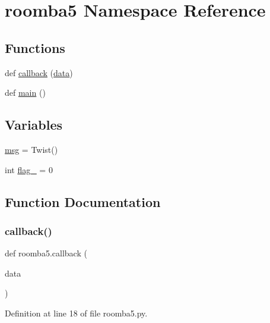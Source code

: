 \hypertarget{namespaceroomba5}{}\section{roomba5 Namespace Reference}
\label{namespaceroomba5}
\subsection*{Functions}
\begin{DoxyCompactItemize}
\item 
def \mbox{\hyperlink{namespaceroomba5_ad07c1fa90ebc06ca037e82ceeb96c024}{callback}} (\mbox{\hyperlink{structdata}{data}})
\item 
def \mbox{\hyperlink{namespaceroomba5_aa7830a6ec64735f4a6689cc04de9e110}{main}} ()
\end{DoxyCompactItemize}
\subsection*{Variables}
\begin{DoxyCompactItemize}
\item 
\mbox{\hyperlink{namespaceroomba5_abac30f38a065446691c5ab88937ed237}{msg}} = Twist()
\item 
int \mbox{\hyperlink{namespaceroomba5_ac8bb0244cccd2213d5c04a634a0760e7}{flag\+\_}} = 0
\end{DoxyCompactItemize}


\subsection{Function Documentation}
\mbox{\label{namespaceroomba5_ad07c1fa90ebc06ca037e82ceeb96c024}} 
\subsubsection{\texorpdfstring{callback()}{callback()}}
{\footnotesize\ttfamily def roomba5.\+callback (\begin{DoxyParamCaption}\item[{}]{data }\end{DoxyParamCaption})}



Definition at line 18 of file roomba5.\+py.

\mbox{\label{namespaceroomba5_aa7830a6ec64735f4a6689cc04de9e110}} 
